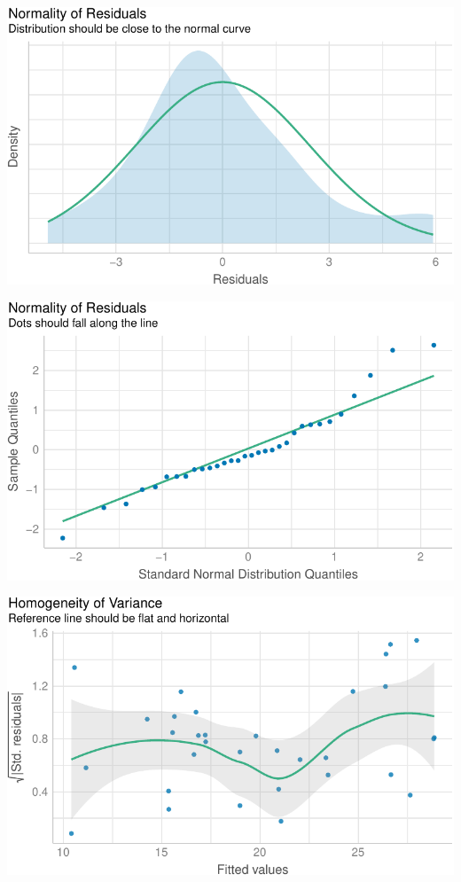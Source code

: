 \documentclass[
]{article}
\begin{document}
\includegraphics{template_files/figure-pdf/unnamed-chunk-10-1.pdf}

\includegraphics{template_files/figure-pdf/unnamed-chunk-10-2.pdf}

\includegraphics{template_files/figure-pdf/unnamed-chunk-11-1.pdf}
\end{document}
